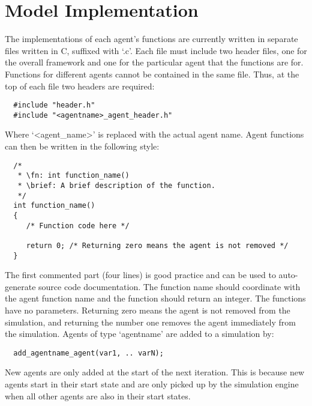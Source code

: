 \section{Model Implementation}
\label{sec:model_implementation}

The implementations of each agent's functions are currently written in separate
files written in C, suffixed with `.c'. Each file must include two
header files, one for the overall framework and one for the particular agent that the functions are for.
Functions for different agents cannot be contained in the same file.
Thus, at the top of each file two headers are required:

\begin{verbatim}
  #include "header.h"
  #include "<agentname>_agent_header.h"
\end{verbatim}

Where `<agent\_name>' is replaced with the actual agent name.
Agent functions can then be written in the following style:

\begin{verbatim}
  /*
   * \fn: int function_name()
   * \brief: A brief description of the function.
   */
  int function_name()
  {
     /* Function code here */
    
     return 0; /* Returning zero means the agent is not removed */
  }
\end{verbatim}

The first commented part (four lines) is good practice and can be used to
auto-generate source code documentation. The function name should coordinate
with the agent function name and the function should return an integer. The
functions have no parameters. Returning zero means the agent is not removed from
the simulation, and returning the number one removes the agent immediately from
the simulation. Agents of type `agentname' are added to a simulation by:

\begin{verbatim}
  add_agentname_agent(var1, .. varN);
\end{verbatim}

New agents are only added at the start of the next iteration. This is because
new agents start in their start state and are only picked up by the 
simulation engine when all other agents are also in their start states.

